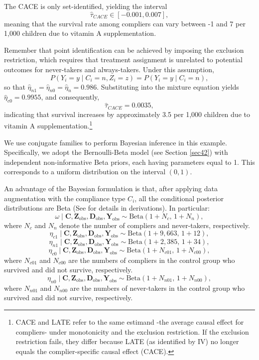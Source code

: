 The CACE is only set-identified, yielding the interval
\[
\hat{\tau}_{CACE} \in [-0.001, 0.007],
\]
meaning that the survival rate among compliers can vary between -1 and 7 per 1,000 children due to vitamin A supplementation.

Remember that point identification can be achieved by imposing the exclusion restriction, which requires that treatment assignment is unrelated to potential outcomes for never-takers and always-takers. Under this assumption,
\[
P(Y_i = y \mid C_i = n, Z_i = z) = P(Y_i = y \mid C_i = n),
\]
so that $\hat{\eta}_{n1} = \hat{\eta}_{n0} = \hat{\eta}_n = 0.986$. Substituting into the mixture equation yields $\hat{\eta}_{c0} = 0.9955$, and consequently,
\[
\hat{\tau}_{CACE} = 0.0035,
\]
indicating that survival increases by approximately 3.5 per 1,000 children due to vitamin A supplementation.\footnote{CACE and LATE refer to the same estimand -the average causal effect for compliers- under monotonicity and the exclusion restriction. If the exclusion restriction fails, they differ because LATE (as identified by IV) no longer equals the complier-specific causal effect (CACE).}
 
We use conjugate families to perform Bayesian inference in this example. Specifically, we adopt the Bernoulli-Beta model (see Section \ref{sec42}) with independent non-informative Beta priors, each having parameters equal to 1. This corresponds to a uniform distribution on the interval $(0,1)$.  

An advantage of the Bayesian formulation is that, after applying data augmentation with the compliance type $C_i$, all the conditional posterior distributions are Beta (See \cite{imbens1997bayesian} for details in derivations). In particular:
\[
\omega \mid \mathbf{C}, \mathbf{Z}_{\text{obs}}, \mathbf{D}_{\text{obs}}, \mathbf{Y}_{\text{obs}} \sim \text{Beta}(1 + N_c,\, 1 + N_n),
\]
where $N_c$ and $N_n$ denote the number of compliers and never-takers, respectively.
\[
\eta_{c1} \mid \mathbf{C}, \mathbf{Z}_{\text{obs}}, \mathbf{D}_{\text{obs}}, \mathbf{Y}_{\text{obs}} \sim \text{Beta}(1 + 9{,}663,\, 1 + 12),
\]
\[
\eta_{n1} \mid \mathbf{C}, \mathbf{Z}_{\text{obs}}, \mathbf{D}_{\text{obs}}, \mathbf{Y}_{\text{obs}} \sim \text{Beta}(1 + 2{,}385,\, 1 + 34),
\]
\[
\eta_{c0} \mid \mathbf{C}, \mathbf{Z}_{\text{obs}}, \mathbf{D}_{\text{obs}}, \mathbf{Y}_{\text{obs}} \sim \text{Beta}(1 + N_{c01},\, 1 + N_{c00}),
\]
where $N_{c01}$ and $N_{c00}$ are the numbers of compliers in the control group who survived and did not survive, respectively.
\[
\eta_{n0} \mid \mathbf{C}, \mathbf{Z}_{\text{obs}}, \mathbf{D}_{\text{obs}}, \mathbf{Y}_{\text{obs}} \sim \text{Beta}(1 + N_{n01},\, 1 + N_{n00}),
\]
where $N_{n01}$ and $N_{n00}$ are the numbers of never-takers in the control group who survived and did not survive, respectively.

